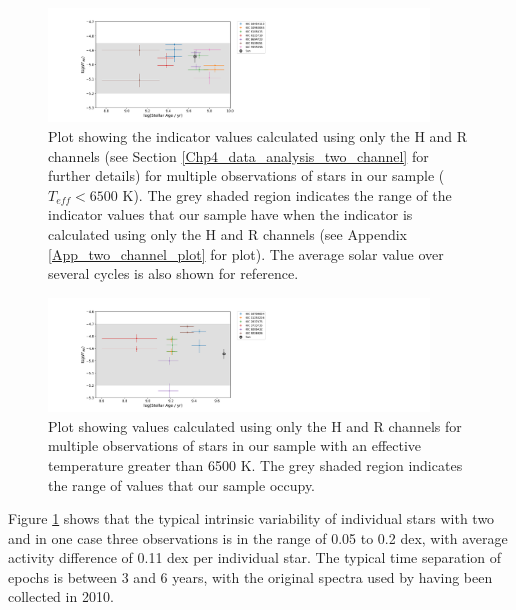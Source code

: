 \begin{figure}
    \centering
    \includegraphics[width=0.9\textwidth]{Figures/4-Chromospheric_age/cool_multiple_obs_plot_with_sun.pdf}
    \caption[Plot showing activity over several epochs for stars with $T_{eff} < 6500$ K]{Plot showing the \Rprime indicator values calculated using only the H and R channels (see Section \ref{Chp4_data_analysis_two_channel} for further details) for multiple observations of stars in our sample ($T_{eff} < 6500$ K). The grey shaded region indicates the range of the \Rprime indicator values that our sample have when the \Rprime indicator is calculated using only the H and R channels (see Appendix \ref{App_two_channel_plot} for plot). The average solar value over several cycles \citep{Egeland_etal_2017} is also shown for reference.}
    \label{fig:ca_multiple_obs}
\end{figure}

\begin{figure}
    \centering
    \includegraphics[width=0.9\textwidth]{Figures/4-Chromospheric_age/hot_multiple_obs_plot_with_sun.pdf}
    \caption[Plot showing activity over several epochs for stars with $T_{eff} > 6500$ K]{Plot showing \Rprime values calculated using only the H and R channels for multiple observations of stars in our sample with an effective temperature greater than 6500 K. The grey shaded region indicates the range of \Rprime values that our sample occupy.}
    \label{fig:ca_multiple_obs_hot_Fstars}
\end{figure}

Figure \ref{fig:ca_multiple_obs} shows that the typical intrinsic variability of individual stars with two and in one case three observations is in the range of 0.05 to 0.2 dex, with average activity difference of 0.11 dex per individual star. The typical time separation of epochs is between 3 and 6 years, with the original spectra used by \citet{Bruntt_etal_2012} having been collected in 2010. 

